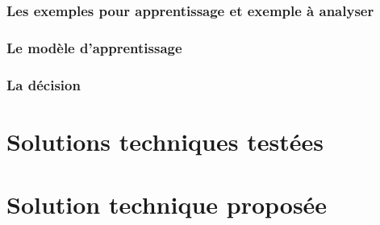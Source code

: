 \subsubsection{Les exemples pour apprentissage et exemple à analyser}
\label{Automatisation du processus d'investigation: Achitecture High Level du système proposé: Les exemples d'apprentissage}

\subsubsection{Le modèle d'apprentissage}
\label{Automatisation du processus d'investigation: Achitecture High Level du système proposé: Le modèle d'apprentissage}

\subsubsection{La décision}
\label{Automatisation du processus d'investigation: Achitecture High Level du système proposé: La décision}



\section{Solutions techniques testées}
\label{Automatisation du processus d'investigation: Solutions techniques testées}




\section{Solution technique proposée}
\label{Automatisation du processus d'investigation: Solution technique proposée}


